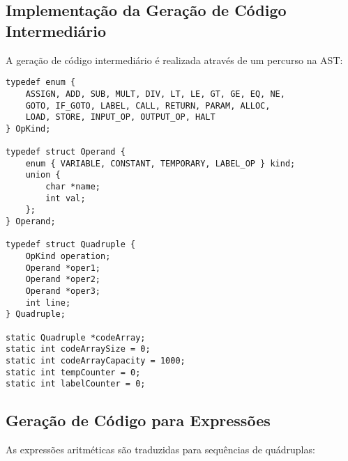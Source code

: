 \documentclass[
	12pt,				%
	oneside,
	a4paper,			%
	english,			%
	french,				%
	spanish,			%
	brazil,				%
	]{abntex2}
\begin{document}
\subsection{Implementação da Geração de Código Intermediário}

A geração de código intermediário é realizada através de um percurso na AST:

\begin{lstlisting}[style=cstyle, caption=Estrutura das quádruplas]
typedef enum {
    ASSIGN, ADD, SUB, MULT, DIV, LT, LE, GT, GE, EQ, NE,
    GOTO, IF_GOTO, LABEL, CALL, RETURN, PARAM, ALLOC,
    LOAD, STORE, INPUT_OP, OUTPUT_OP, HALT
} OpKind;

typedef struct Operand {
    enum { VARIABLE, CONSTANT, TEMPORARY, LABEL_OP } kind;
    union {
        char *name;
        int val;
    };
} Operand;

typedef struct Quadruple {
    OpKind operation;
    Operand *oper1;
    Operand *oper2;
    Operand *oper3;
    int line;
} Quadruple;

static Quadruple *codeArray;
static int codeArraySize = 0;
static int codeArrayCapacity = 1000;
static int tempCounter = 0;
static int labelCounter = 0;
\end{lstlisting}

\subsection{Geração de Código para Expressões}

As expressões aritméticas são traduzidas para sequências de quádruplas:
\end{document}
